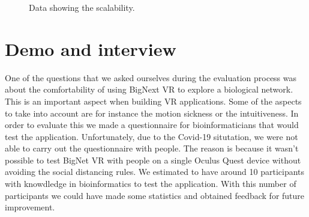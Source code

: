 \begin{figure}[h]

\caption{Data showing the scalability.}
\end{figure}

\section{Demo and interview}
One of the questions that we asked ourselves during the evaluation process was about the comfortability of using BigNext VR to explore a biological network. This is an important aspect when building VR applications. Some of the aspects to take into account are for instance the motion sickness or the intuitiveness. In order to evaluate this we made a questionnaire for bioinformaticians that would test the application. Unfortunately, due to the Covid-19 situtation\cite{covid_19}, we were not able to carry out the questionnaire with people. The reason is because it wasn't possible to test BigNet VR with people on a single Oculus Quest device without avoiding the social distancing rules.
We estimated to have around 10 participants with knowdledge in bioinformatics to test the application. With this number of participants we could have made some statistics and obtained feedback for future improvement.

